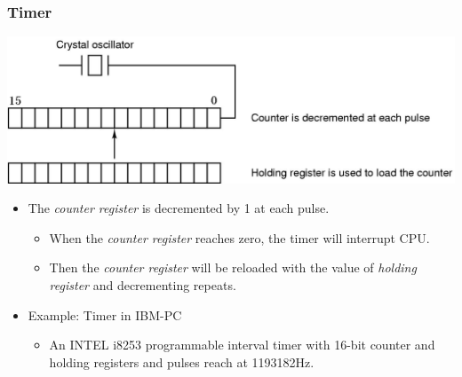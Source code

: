 \documentclass[CJKutf8,xcolor=pdftex,dvipsnames,table]{beamer}
\begin{document}
\begin{CJK*}{UTF8}{song}
  \begin{frame}
    \frametitle{Timer} \pause
    \begin{center}
      \includegraphics[scale=.2]{mosv2f5-31} \pause
    \end{center}
    \begin{itemize}
    \item{The \emph{counter register} is decremented by 1 at each pulse.} \pause
      \begin{itemize}
      \item{When the \emph{counter register} reaches zero, the timer will interrupt CPU.} \pause
      \item{Then the \emph{counter register} will be reloaded with the value of \emph{holding register} and decrementing repeats.} \pause
      \end{itemize}
    \item{Example: Timer in IBM-PC} \pause
      \begin{itemize}
      \item{An INTEL i8253 programmable interval timer with 16-bit counter and holding registers and pulses reach at 1193182Hz.}
      \end{itemize}
    \end{itemize}

  \end{frame}


\end{CJK*}
\end{document}
